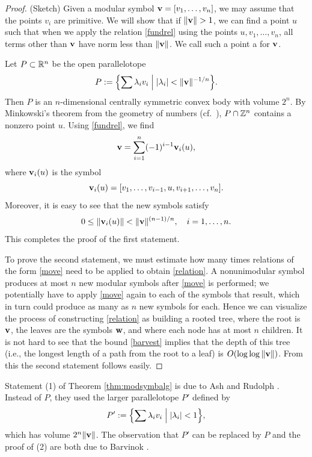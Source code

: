 \begin{proof}
%
(Sketch)
Given a modular symbol ${\mathbf {v}} =[v_{1},\dotsc ,v_{n}]$, we may assume
that the points $v_{i}$ are primitive.  We will show that if
$\norm{\vv}>1$, we can find a point $u$ such that when we apply the
relation \eqref{fundrel} using the points $u,v_{1},\dotsc ,v_{n}$, all
terms other than ${\mathbf {v}}$ have norm less than $\|{\mathbf {v}}\|$.  We call such
a point a  for ${\mathbf {v}}$.

Let $P\subset \mathbb{R}^{n}$ be the open parallelotope
\[
P:=\Bigl\{\sum \lambda _{i}v _{i}\Bigm | |\lambda_{i} |< \|{\mathbf {v}} \|^{-1/n}
\Bigr\}. 
\]
Then $P$ is an $n$-dimensional centrally symmetric convex body with
volume $2^{n}$.  By Minkowski's theorem from the geometry of numbers
(cf.~\cite[IV.2.6]{fr.tay}), $P\cap \mathbb{Z} ^{n}$ contains a nonzero point
$u$.  
Using \eqref{fundrel}, we find 
\begin{equation}\label{move}
{\mathbf {v}} = \sum_{i=1}^{n} (-1)^{i-1}{\mathbf {v}}_{i} (u),
\end{equation}
where ${\mathbf {v}}_{i} (u)$ is the symbol
\[
{\mathbf {v}}_{i} (u) = [v_{1},\dotsc ,v_{i-1},u, v_{i+1},\dotsc ,v_{n}].
\]
Moreover, it is easy to see that the new symbols satisfy
\begin{equation}\label{barvest}
0\leq \|{\mathbf {v}}_{i} (u)\|<\|{\mathbf {v}}\|^{(n-1)/n}, \quad i=1,\dotsc ,n.
\end{equation}
This completes the proof of the first statement.

To prove the second statement, we must estimate how many times
relations of the form \eqref{move} need to be applied to obtain
\eqref{relation}.  A nonunimodular symbol produces at most $n$ new
modular symbols after \eqref{move} is performed; we potentially have
to apply \eqref{move} again to each of the symbols that result, which
in turn could produce as many as $n$ new symbols for each.  Hence we
can visualize the process of constructing \eqref{relation} as building
a rooted tree, where the root is ${\mathbf {v}}$, the leaves are the symbols
${\mathbf {w}}$, and where each node has at most $n$ children.  It is not hard
to see that the bound \eqref{barvest} implies that the depth of this
tree (i.e., the longest length of a path from the root to a leaf) is
$O(\log \log \|{\mathbf {v}}\|)$.  From this the second statement follows
easily.
%
\end{proof}

Statement (1) of Theorem \ref{thm:modsymbalg} is due to Ash and Rudolph
\cite{ash.rudolph}.  Instead of $P$, they used the larger
parallelotope $P'$ defined by 
\[
P':=\Bigl\{\sum \lambda _{i}v _{i}\Bigm | |\lambda_{i} |< 1
\Bigr\},
\]
which has volume $2^{n}\|{\mathbf {v}}\|$.  The observation that $P'$ can be
replaced by $P$ and the proof of (2) are both due to Barvinok
\cite{barvinok}.

